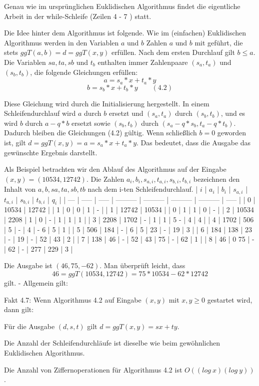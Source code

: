 \documentclass[a4paper]{article}
\begin{document}
\begin{multicols}{3}
    Genau wie im ursprünglichen Euklidischen Algorithmus findet die eigentliche Arbeit in der while-Schleife (Zeilen 4 - 7 ) statt.

    Die Idee hinter dem Algorithmus ist folgende. Wie im (einfachen) Euklidischen Algorithmus werden in den Variablen $a$ und $b$ Zahlen $a$ und $b$ mit geführt, die stets $ggT(a,b) =d= ggT(x,y)$ erfüllen. Nach dem ersten Durchlauf gilt $b\leq a$. Die Variablen $sa,ta,sb$ und $t_b$ enthalten immer Zahlenpaare $(s_a,t_a)$ und $(s_b,t_b)$, die folgende Gleichungen erfüllen:
    $$a=s_a*x+t_a*y$$
    $$b=s_b*x+t_b*y \quad\quad(4.2)$$

    Diese Gleichung wird durch die Initialisierung hergestellt. In einem Schleifendurchlauf wird $a$ durch $b$ ersetzt und $(s_a,t_a)$ durch $(s_b,t_b)$, und es wird $b$ durch $a-q*b$ ersetzt sowie $(s_b,t_b)$ durch $(s_a-q*s_b, t_a-q*t_b)$. Dadurch bleiben die Gleichungen (4.2) gültig. Wenn schließlich $b=0$ geworden ist, gilt $d=ggT(x,y) =a=s_a*x+t_a*y$. Das bedeutet, dass die Ausgabe das gewünschte Ergebnis darstellt.

    Als Beispiel betrachten wir den Ablauf des Algorithmus auf der Eingabe $(x,y) =(10534,12742)$. Die Zahlen $a_i,b_i,s_{a,i},t_{a,i},s_{b,i},t_{b,i}$ bezeichnen den Inhalt von $a,b,sa,ta,sb,tb$ nach dem i-ten Schleifendurchlauf.
    | $i$ | $a_i$ | $b_i$ | $s_{a,i}$ | $t_{a,i}$ | $s_{b,i}$ | $t_{b,i}$ | $q_i$ |
    | --- | ----- | ----- | --------- | --------- | --------- | --------- | ----- |
    | 0   | 10534 | 12742 |           | 1         | 0         | 0         | 1     | -  |
    | 1   | 12742 | 10534 |           | 0         | 1         | 1         | 0     | -  |
    | 2   | 10534 | 2208  | 1         | 0         | -         | 1         | 1     | 1  |
    | 3   | 2208  | 1702  | -         | 1         | 1         | 5 -       | 4     | 4  |
    | 4   | 1702  | 506   | 5         | -         | 4         | - 6       | 5     | 1  |
    | 5   | 506   | 184   | -         | 6         | 5         | 23        | -     | 19 | 3 |
    | 6   | 184   | 138   | 23        | -         | 19        | -         | 52    | 43 | 2 |
    | 7   | 138   | 46    | -         | 52        | 43        | 75        | -     | 62 | 1 |
    | 8   | 46    | 0 75  | -         | 62        | -         | 277       | 229   | 3  |

    Die Ausgabe ist $(46, 75 ,-62)$. Man überprüft leicht, dass
    $$46 = ggT(10534,12742) = 75* 10534 - 62 * 12742$$
    gilt. - Allgemein gilt:

    Fakt 4.7: Wenn Algorithmus 4.2 auf Eingabe $(x,y)$ mit $x,y\geq 0$ gestartet wird, dann gilt:
    \begin{enumerate*}
        \item Für die Ausgabe $(d,s,t)$ gilt $d= ggT(x,y) =sx+ty$.
        \item  Die Anzahl der Schleifendurchläufe ist dieselbe wie beim gewöhnlichen Euklidischen Algorithmus.
        \item  Die Anzahl von Ziffernoperationen für Algorithmus 4.2 ist $O((log\ x)(log\ y))$.
    \end{enumerate*}


\end{multicols}
\end{document}
